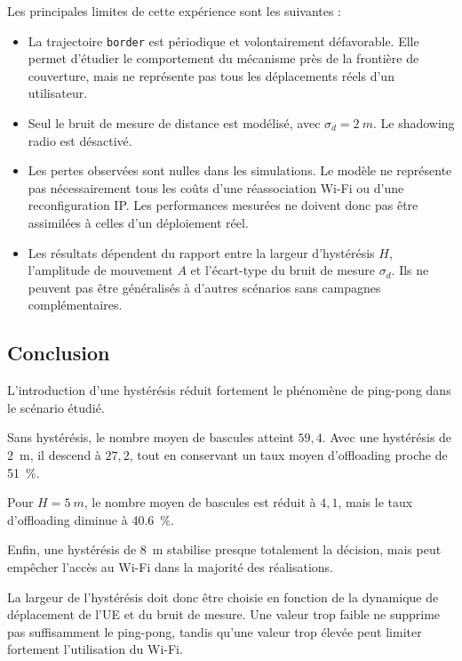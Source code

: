 Les principales limites de cette expérience sont les suivantes :

\begin{itemize}

\item La trajectoire \texttt{border} est périodique et volontairement
défavorable. Elle permet d'étudier le comportement du mécanisme
près de la frontière de couverture, mais ne représente pas
tous les déplacements réels d'un utilisateur.

\item Seul le bruit de mesure de distance est modélisé,
avec $\sigma_d=\SI{2}{m}$. Le shadowing radio est désactivé.

\item Les pertes observées sont nulles dans les simulations.
Le modèle ne représente pas nécessairement tous les coûts
d'une réassociation Wi-Fi ou d'une reconfiguration IP.
Les performances mesurées ne doivent donc pas être assimilées
à celles d'un déploiement réel.

\item Les résultats dépendent du rapport entre la largeur
d'hystérésis $H$, l'amplitude de mouvement $A$ et l'écart-type
du bruit de mesure $\sigma_d$. Ils ne peuvent pas être
généralisés à d'autres scénarios sans campagnes complémentaires.

\end{itemize}

\subsection{Conclusion}

L'introduction d'une hystérésis réduit fortement le phénomène
de ping-pong dans le scénario étudié.

Sans hystérésis, le nombre moyen de bascules atteint $59{,}4$.
Avec une hystérésis de \SI{2}{m}, il descend à $27{,}2$,
tout en conservant un taux moyen d'offloading proche de
\SI{51}{\percent}.

Pour $H=\SI{5}{m}$, le nombre moyen de bascules est réduit
à $4{,}1$, mais le taux d'offloading diminue à
\SI{40,6}{\percent}.

Enfin, une hystérésis de \SI{8}{m} stabilise presque totalement
la décision, mais peut empêcher l'accès au Wi-Fi dans la majorité
des réalisations.

La largeur de l'hystérésis doit donc être choisie en fonction
de la dynamique de déplacement de l'UE et du bruit de mesure.
Une valeur trop faible ne supprime pas suffisamment le ping-pong,
tandis qu'une valeur trop élevée peut limiter fortement
l'utilisation du Wi-Fi.

